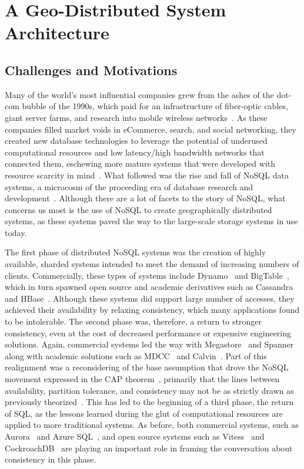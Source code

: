 
\renewcommand{\thechapter}{2}

\chapter{A Geo-Distributed System Architecture}
\label{ch:architecture}

\section{Challenges and Motivations}

Many of the world's most influential companies grew from the ashes of the dot-com bubble of the 1990s, which paid for an infrastructure of fiber-optic cables, giant server farms, and research into mobile wireless networks~\cite{casey_blockchain_2018}.
As these companies filled market voids in eCommerce, search, and social networking, they created new database technologies to leverage the potential of underused computational resources and low latency/high bandwidth networks that connected them, eschewing more mature systems that were developed with resource scarcity in mind~\cite{stonebraker_what_2005,stonebraker_mapreduce_2010}.
What followed was the rise and fall of NoSQL data systems, a microcosm of the proceeding era of database research and development~\cite{mohan_history_2013}.
Although there are a lot of facets to the story of NoSQL, what concerns us most is the use of NoSQL to create geographically distributed systems, as these systems paved the way to the large-scale storage systems in use today.

The first phase of distributed NoSQL systems was the creation of highly available, sharded systems intended to meet the demand of increasing numbers of clients.
Commercially, these types of systems include Dynamo~\cite{dynamo} and BigTable~\cite{bigtable}, which in turn spawned open source and academic derivatives such as Cassandra~\cite{cassandra} and HBase~\cite{hbase}.
Although these systems did support large number of accesses, they achieved their availability by relaxing consistency, which many applications found to be intolerable.
The second phase was, therefore, a return to stronger consistency, even at the cost of decreased performance or expensive engineering solutions.
Again, commercial systems led the way with Megastore~\cite{megastore} and Spanner~\cite{spanner} along with academic solutions such as MDCC~\cite{mdcc} and Calvin~\cite{calvindb,calvinfs}.
Part of this realignment was a reconsidering of the base assumption that drove the NoSQL movement expressed in the CAP theorem~\cite{cap}, primarily that the lines between availability, partition tolerance, and consistency may not be as strictly drawn as previously theorized~\cite{hat,consistency_tradeoffs}.
This has led to the beginning of a third phase, the return of SQL, as the lessons learned during the glut of computational resources are applied to more traditional systems.
As before, both commercial systems, such as Aurora~\cite{aurora} and Azure SQL~\cite{azure_sql_database}, and open source systems such as Vitess~\cite{vitess} and CockroachDB~\cite{cockroachdb} are playing an important role in framing the conversation about consistency in this phase.

